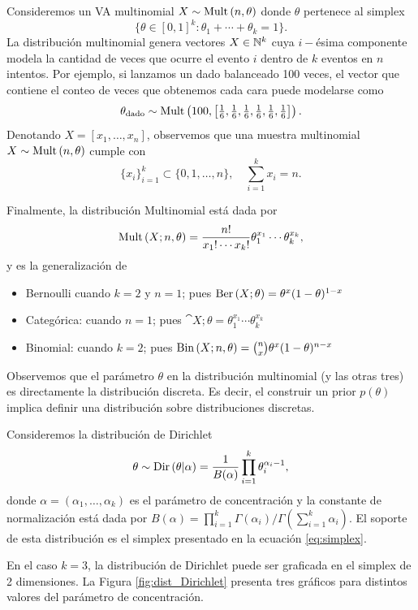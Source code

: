 \begin{example}
Consideremos un VA multinomial $X\sim\text{Mult}\left(n,\theta\right)$ donde $\theta$ pertenece al simplex 
\begin{equation}
	\label{eq:simplex}
  \{\theta\in[0,1]^k:\theta_1 + \cdots + \theta_k = 1 \}.
 \end{equation} 
 La distribución multinomial genera vectores $X\in{\mathbb N}^k$ cuya $i-$ésima componente modela la cantidad de veces que ocurre el evento $i$ dentro de $k$ eventos en $n$ intentos. Por ejemplo, si lanzamos un dado balanceado 100 veces, el vector que contiene el conteo de veces que obtenemos cada cara puede modelarse como 
 \begin{equation}
  	\theta_\text{dado} \sim \text{Mult}\left(100,\left[\tfrac{1}{6},\tfrac{1}{6},\tfrac{1}{6},\tfrac{1}{6},\tfrac{1}{6},\tfrac{1}{6}\right]\right).
  \end{equation} 
Denotando $X=[x_1,\ldots,x_n]$, observemos que una muestra multinomial $X\sim\text{Mult}\left(n,\theta\right)$ cumple con 
\begin{equation}
	\{x_i\}_{i=1}^k \subset \{0,1,\ldots,n\},\quad  \sum_{i=1}^kx_i = n.
\end{equation}

Finalmente, la distribución Multinomial está dada por 
\begin{equation}
 	\text{Mult}\left(X;n,\theta\right) = \frac{n!}{x_1!\cdots x_k!} \theta_1^{x_1}\cdots\theta_k^{x_k},
 \end{equation} 
 y es la generalización de 
\begin{itemize}
	\item Bernoulli cuando $k=2$ y $n=1$; pues $\text{Ber}\left(X;\theta\right) = \theta^{x} (1-\theta)^{1-x}$
	\item Categórica: cuando $n=1$; pues $\cat{X;\theta} = \theta_1^{x_1}\cdots\theta_k^{x_k}$
	\item Binomial: cuando $k=2$; pues $\text{Bin}\left(X;n,\theta\right) = \binom{n}{x} \theta^{x}(1-\theta)^{n-x}$
\end{itemize}
\end{example}

Observemos que el parámetro $\theta$ en la distribución multinomial (y las otras tres) es directamente la distribución discreta. Es decir, el construir un prior $p(\theta)$ implica definir una distribución sobre distribuciones discretas.  


\begin{definition}
Consideremos la  distribución de Dirichlet
\begin{equation}
	\theta \sim \text{Dir}\left(\theta|\alpha\right) = \frac{1}{B(\alpha)} \prod_{i=1}^k \theta_i^{\alpha_i-1},
\end{equation}
donde $\alpha = (\alpha_1,\ldots,\alpha_k)$ es el parámetro de concentración y la constante de normalización está dada por $B(\alpha)=\prod_{i=1}^k\Gamma(\alpha_i)/\Gamma(\sum_{i=1}^k\alpha_i)$. El soporte de esta distribución es el simplex presentado en la ecuación \eqref{eq:simplex}.
\end{definition}
En el caso $k=3$, la distribución de Dirichlet puede ser graficada en el simplex de 2 dimensiones. La Figura \ref{fig:dist_Dirichlet} presenta tres gráficos para distintos valores del parámetro de concentración. 

